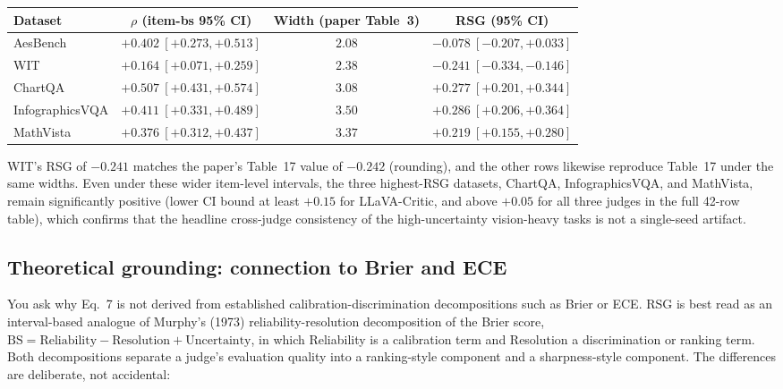 \documentclass[11pt]{article}
\begin{document}
\begin{center}
\small
\begin{tabular}{lccc}
\toprule
\textbf{Dataset} & $\rho$ \textbf{(item-bs 95\% CI)} & \textbf{Width (paper Table~3)} & \textbf{RSG (95\% CI)} \\
\midrule
AesBench         & $+0.402\ [+0.273, +0.513]$ & $2.08$ & $-0.078\ [-0.207, +0.033]$ \\
WIT              & $+0.164\ [+0.071, +0.259]$ & $2.38$ & $-0.241\ [-0.334, -0.146]$ \\
ChartQA          & $+0.507\ [+0.431, +0.574]$ & $3.08$ & $+0.277\ [+0.201, +0.344]$ \\
InfographicsVQA  & $+0.411\ [+0.331, +0.489]$ & $3.50$ & $+0.286\ [+0.206, +0.364]$ \\
MathVista        & $+0.376\ [+0.312, +0.437]$ & $3.37$ & $+0.219\ [+0.155, +0.280]$ \\
\bottomrule
\end{tabular}
\end{center}

WIT's RSG of $-0.241$ matches the paper's Table~17 value of $-0.242$ (rounding), and the other rows likewise reproduce Table~17 under the same widths. Even under these wider item-level intervals, the three highest-RSG datasets, ChartQA, InfographicsVQA, and MathVista, remain significantly positive (lower CI bound at least $+0.15$ for LLaVA-Critic, and above $+0.05$ for all three judges in the full 42-row table), which confirms that the headline cross-judge consistency of the high-uncertainty vision-heavy tasks is not a single-seed artifact.

\subsection*{Theoretical grounding: connection to Brier and ECE}

You ask why Eq.\ 7 is not derived from established calibration-discrimination decompositions such as Brier or ECE. RSG is best read as an interval-based analogue of Murphy's (1973) reliability-resolution decomposition of the Brier score, $\mathrm{BS} = \mathrm{Reliability} - \mathrm{Resolution} + \mathrm{Uncertainty}$, in which Reliability is a calibration term and Resolution a discrimination or ranking term. Both decompositions separate a judge's evaluation quality into a ranking-style component and a sharpness-style component. The differences are deliberate, not accidental:
\end{document}
